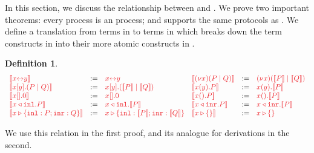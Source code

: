 \documentclass[submission,copyright,creativecommons]{eptcs}
\def\coloneqq{\mathbin{:=}}
\newtheorem{definition}[lemma]{Definition}
\begin{document}
In this section, we discuss the relationship between \cp and \hcp. We prove two important theorems: every \cp process is an \hcp process; and \hcp supports the same protocols as \cp. We define a translation from terms in \cp to terms in \hcp which breaks down the term constructs in \cp into their more atomic constructs in \hcp.
\begin{definition}\label{def:cp2hcp-terms}
  \[
    \begin{array}{lcllcl}
         \tm{\mtf{\cpLink{x}{y}}}
      &  \coloneqq & \tm{\cpLink{x}{y}}
      &  \tm{\mtf{\cpCut{x}{P}{Q}}}
      &  \coloneqq & \tm{\piNew{x}{(\piPar{\mtf{P}}{\mtf{Q}})}}
      \\ \tm{\mtf{\cpSend{x}{y}{P}{Q}}}
      &  \coloneqq & \tm{\piBoundSend{x}{y}{(\piPar{\mtf{P}}{\mtf{Q}})}}
      &  \tm{\mtf{\cpRecv{x}{y}{P}}}
      &  \coloneqq & \tm{\piRecv{x}{y}{\mtf{P}}}
      \\ \tm{\mtf{\cpHalt{x}}}
      &  \coloneqq & \tm{\piBoundSend{x}{}{\piHalt}}
      &  \tm{\mtf{\cpWait{x}{P}}}
      &  \coloneqq & \tm{\piRecv{x}{}{\mtf{P}}}
      \\ \tm{\mtf{\cpInl{x}{P}}}
      &  \coloneqq & \tm{\cpInl{x}{\mtf{P}}}
      &  \tm{\mtf{\cpInr{x}{P}}}
      &  \coloneqq & \tm{\cpInr{x}{\mtf{P}}}
      \\ \tm{\mtf{\cpCase{x}{P}{Q}}}
      &  \coloneqq & \tm{\cpCase{x}{\mtf{P}}{\mtf{Q}}}
      &  \tm{\mtf{\cpAbsurd{x}}}
      &  \coloneqq & \tm{\cpAbsurd{x}}
    \end{array}
  \]
\end{definition}\noindent
We use this relation in the first proof, and its analogue for derivations in the second.
\end{document}
